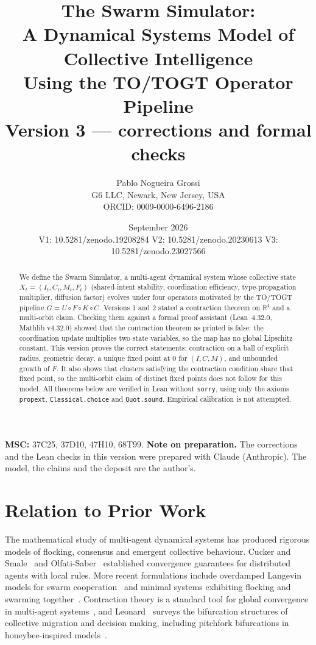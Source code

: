 \documentclass[11pt]{article}
\title{The Swarm Simulator:\\ A Dynamical Systems Model of Collective Intelligence\\
Using the TO/TOGT Operator Pipeline\\[4pt]
\large Version 3 --- corrections and formal checks}
\author{Pablo Nogueira Grossi\\ G6 LLC, Newark, New Jersey, USA\\
ORCID: 0009-0000-6496-2186}
\date{September 2026\\[2pt]
{\small V1: 10.5281/zenodo.19208284 \quad V2: 10.5281/zenodo.20230613 \quad V3: 10.5281/zenodo.23027566}}
\theoremstyle{definition}
\theoremstyle{remark}
\newcommand{\R}{\mathbb{R}}
\begin{document}
\maketitle

\begin{abstract}
We define the Swarm Simulator, a multi-agent dynamical system whose collective state
$X_t=(I_t,C_t,M_t,F_t)$ (shared-intent stability, coordination efficiency, type-propagation multiplier,
diffusion factor) evolves under four operators motivated by the TO/TOGT pipeline $G=U\circ F\circ K\circ C$.
Versions 1 and 2 stated a contraction theorem on $\R^4$ and a multi-orbit claim. Checking them against a
formal proof assistant (Lean~4.32.0, Mathlib v4.32.0) showed that the contraction theorem as printed is false:
the coordination update multiplies two state variables, so the map has no global Lipschitz constant.
This version proves the correct statements: contraction on a ball of explicit radius, geometric decay,
a unique fixed point at $0$ for $(I,C,M)$, and unbounded growth of $F$. It also shows that clusters satisfying
the contraction condition share that fixed point, so the multi-orbit claim of distinct fixed points does
not follow for this model. All theorems below are verified in Lean without \texttt{sorry}, using only the axioms
\texttt{propext}, \texttt{Classical.choice} and \texttt{Quot.sound}. Empirical calibration is not attempted.
\end{abstract}

\noindent\textbf{MSC:} 37C25, 37D10, 47H10, 68T99.\quad
\textbf{Note on preparation.} The corrections and the Lean checks in this version were prepared with Claude
(Anthropic). The model, the claims and the deposit are the author's.

\section{Relation to Prior Work}
The mathematical study of multi-agent dynamical systems has produced rigorous models of flocking, consensus
and emergent collective behaviour. Cucker and Smale~\cite{cs} and Olfati-Saber~\cite{os} established convergence
guarantees for distributed agents with local rules. More recent formulations include overdamped Langevin
models for swarm cooperation~\cite{nitti} and minimal systems exhibiting flocking and swarming
together~\cite{sar}. Contraction theory is a standard tool for global convergence in multi-agent
systems~\cite{riv}, and Leonard~\cite{leo} surveys the bifurcation structures of collective migration and
decision making, including pitchfork bifurcations in honeybee-inspired models~\cite{gray}.
\end{document}
